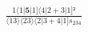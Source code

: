 \documentclass[varwidth, border=5pt]{standalone}
\begin{document}
\begin{my}
$\begin{gathered}
\scriptscriptstyle\frac{1⟨1|𝟓|1]⟨4|2+3|1]²}{⟨13⟩⟨23⟩⟨2|3+4|1]s_{234}}
\end{gathered}$
\end{my}
\end{document}

